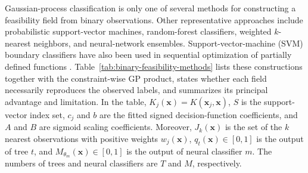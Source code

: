 \documentclass[twoside]{article}
\begin{document}
Gaussian-process classification is only one of several methods for constructing
a feasibility field from binary observations. Other representative approaches
include probabilistic support-vector machines, random-forest classifiers,
weighted \(k\)-nearest neighbors, and neural-network ensembles.
Support-vector-machine (SVM) boundary classifiers have also been used in
sequential optimization of partially defined functions
\cite{candelieri2021partially}.
Table~\ref{tab:binary-feasibility-methods} lists these constructions together
with the constraint-wise GP product, states whether each field necessarily
reproduces the observed labels, and summarizes its principal advantage and
limitation. In the table,
\(K_j(\mathbf{x})=K(\mathbf{x}_j,\mathbf{x})\),
\(S\) is the support-vector index set, \(c_j\) and \(b\) are the fitted signed
decision-function coefficients, and \(A\) and \(B\) are sigmoid scaling
coefficients. Moreover, \(J_k(\mathbf{x})\) is the set of
the \(k\) nearest observations with positive weights \(w_j(\mathbf{x})\),
\(q_t(\mathbf{x})\in[0,1]\) is the output of tree \(t\), and
\(M_{\theta_m}(\mathbf{x})\in[0,1]\) is the output of neural classifier
\(m\). The numbers of trees and neural classifiers are \(T\) and \(M\),
respectively.
\end{document}
